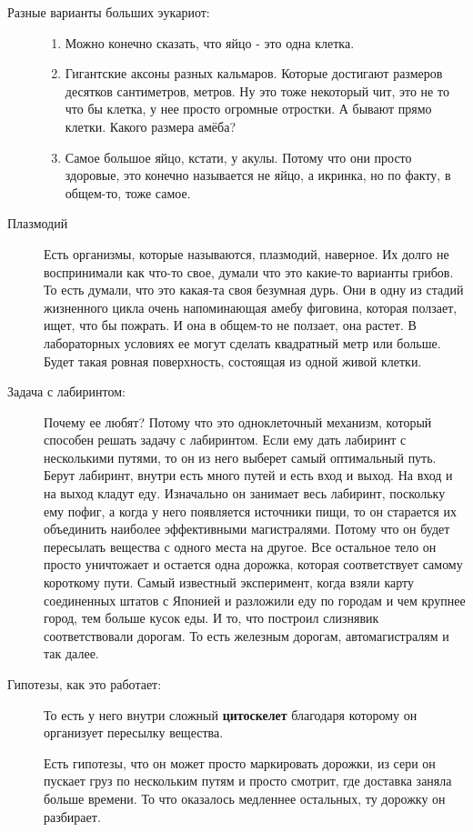 \begin{description}
\begin{description}
\item[Разные варианты больших эукариот:]
\begin{enumerate}
\item Можно конечно сказать, что яйцо - это одна клетка. 
\item Гигантские аксоны разных кальмаров. 
Которые достигают размеров десятков сантиметров, метров. 
Ну это тоже некоторый чит, это не то что бы клетка, у нее просто огромные отростки. 
А бывают прямо клетки. Какого размера амёба? 
\item Самое большое яйцо, кстати, у акулы. Потому что они просто
здоровые, это конечно называется не яйцо,
а икринка, но по факту, в общем-то, тоже самое.
\end{enumerate}
\item[Плазмодий] 
Есть организмы, которые называются, плазмодий, наверное.
Их долго не воспринимали как что-то свое, думали что
это какие-то варианты грибов. То есть думали, что
это какая-та своя безумная дурь. Они в одну из
стадий жизненного цикла очень напоминающая амебу фиговина,
которая ползает, ищет, что бы пожрать. И она в общем-то
не ползает, она растет. 
В лабораторных условиях
ее могут сделать квадратный метр или больше. Будет такая
ровная поверхность, состоящая из одной живой клетки.
\item[Задача с лабиринтом:]
Почему ее любят? Потому что это одноклеточный механизм,
который способен решать задачу с лабиринтом. Если
ему дать лабиринт с несколькими путями, то
он из него выберет самый оптимальный путь.
Берут лабиринт, внутри есть много путей и есть
вход и выход. На вход и на выход кладут еду.
Изначально он занимает весь лабиринт, поскольку
ему пофиг, а когда у него
появляется источники пищи, то он старается их объединить
наиболее эффективными магистралями. Потому что он будет пересылать
вещества с одного места на другое. Все остальное тело он
просто уничтожает и остается одна
дорожка, которая соответствует самому короткому пути.
Самый известный эксперимент, когда взяли карту соединенных 
штатов с Японией и разложили еду по городам и чем крупнее 
город, тем больше кусок еды. И то, что построил слизнявик 
соответствовали дорогам. То есть железным дорогам, 
автомагистралям и так далее. 

\item[Гипотезы, как это работает:]
То есть у него внутри сложный \textbf{цитоскелет} благодаря которому 
он организует пересылку вещества. 

Есть гипотезы, что он может просто маркировать дорожки, из 
сери он пускает груз по нескольким путям и просто смотрит, 
где доставка заняла больше времени. То что оказалось медленнее остальных, 
ту дорожку он разбирает.  

\end{description}
\end{description}

